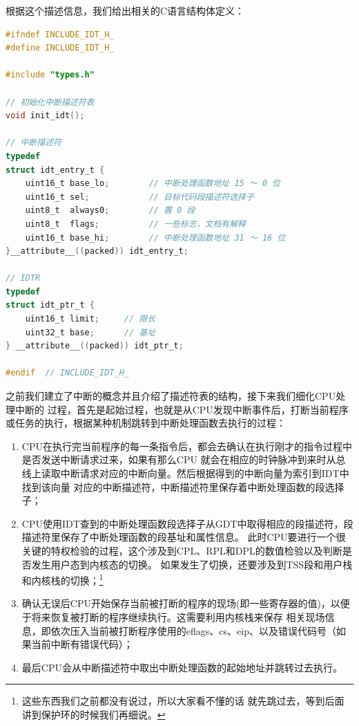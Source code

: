 \par 根据这个描述信息，我们给出相关的C语言结构体定义：

\begin{lstlisting}[language = C, caption = include/idt.h]
#ifndef INCLUDE_IDT_H_
#define INCLUDE_IDT_H_

#include "types.h"

// 初始化中断描述符表
void init_idt();

// 中断描述符
typedef
struct idt_entry_t {
	uint16_t base_lo;        // 中断处理函数地址 15 ～ 0 位
	uint16_t sel;            // 目标代码段描述符选择子
	uint8_t  always0;        // 置 0 段
	uint8_t  flags;          // 一些标志，文档有解释
	uint16_t base_hi;        // 中断处理函数地址 31 ～ 16 位
}__attribute__((packed)) idt_entry_t;

// IDTR
typedef
struct idt_ptr_t {
	uint16_t limit; 	// 限长
	uint32_t base; 		// 基址
} __attribute__((packed)) idt_ptr_t;

#endif 	// INCLUDE_IDT_H_
\end{lstlisting}

\par 之前我们建立了中断的概念并且介绍了描述符表的结构，接下来我们细化CPU处理中断的\allowbreak
过程，首先是起始过程，也就是从CPU发现中断事件后，打断当前程序或任务的执行，根据某种机制跳转到中断处理函数去执行的过程：
\begin{enumerate}
	\item CPU在执行完当前程序的每一条指令后，都会去确认在执行刚才的指令过程中是否发送中断请求过来，如果有那么CPU\allowbreak
		就会在相应的时钟脉冲到来时从总线上读取中断请求对应的中断向量。然后根据得到的中断向量为索引到IDT中找到该向量\allowbreak
		对应的中断描述符，中断描述符里保存着中断处理函数的段选择子；
	\item CPU使用IDT查到的中断处理函数段选择子从GDT中取得相应的段描述符，段描述符里保存了中断处理函数的段基址和属性信息。\allowbreak
		此时CPU要进行一个很关键的特权检验的过程，这个涉及到CPL、RPL和DPL的数值检验以及判断是否发生用户态到内核态的切换。\allowbreak
		如果发生了切换，还要涉及到TSS段和用户栈和内核栈的切换；\footnote{这些东西我们之前都没有说过，所以大家看不懂的话\allowbreak
		就先跳过去，等到后面讲到保护环的时候我们再细说。}
	\item 确认无误后CPU开始保存当前被打断的程序的现场(即一些寄存器的值)，以便于将来恢复被打断的程序继续执行。这需要利用内核栈来保存\allowbreak
		相关现场信息，即依次压入当前被打断程序使用的eflags、cs、eip、以及错误代码号（如果当前中断有错误代码）；
	\item 最后CPU会从中断描述符中取出中断处理函数的起始地址并跳转过去执行。
\end{enumerate}

